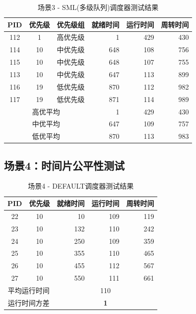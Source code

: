 \documentclass[a4paper, 12pt]{article}
\begin{document}
\begin{table}[H]
	\centering
	\caption{场景3 - SML(多级队列)调度器测试结果}
	\begin{tabular}{cccrrr}
		\toprule
		\textbf{PID} & \textbf{优先级} & \textbf{优先级组} & \textbf{就绪时间} & \textbf{运行时间} & \textbf{周转时间} \\
		\midrule
		112 & 1 & 高优先级 & 1 & 429 & 430 \\
		114 & 10 & 中优先级 & 648 & 108 & 756 \\
		115 & 10 & 中优先级 & 648 & 107 & 755 \\
		113 & 10 & 中优先级 & 647 & 113 & 899 \\
		116 & 19 & 低优先级 & 870 & 112 & 982 \\
		117 & 19 & 低优先级 & 871 & 114 & 989 \\
		\midrule
		\multicolumn{3}{c}{高优平均} & 1 & 429 & 430 \\
		\multicolumn{3}{c}{中优平均} & 647 & 109 & 757 \\
		\multicolumn{3}{c}{低优平均} & 870 & 113 & 983 \\
		\bottomrule
	\end{tabular}
\end{table}

\subsection{场景4：时间片公平性测试}

\begin{table}[H]
	\centering
	\caption{场景4 - DEFAULT调度器测试结果}
	\begin{tabular}{ccrrr}
		\toprule
		\textbf{PID} & \textbf{优先级} & \textbf{就绪时间} & \textbf{运行时间} & \textbf{周转时间} \\
		\midrule
		22 & 10 & 10 & 109 & 119 \\
		23 & 10 & 132 & 110 & 242 \\
		24 & 10 & 250 & 109 & 359 \\
		25 & 10 & 355 & 110 & 465 \\
		26 & 10 & 455 & 112 & 567 \\
		27 & 10 & 550 & 111 & 661 \\
		\midrule
		\multicolumn{2}{c}{平均运行时间} & \multicolumn{3}{c}{110} \\
		\multicolumn{2}{c}{运行时间方差} & \multicolumn{3}{c}{\textbf{1}} \\
		\bottomrule
	\end{tabular}
\end{table}
\end{document}
